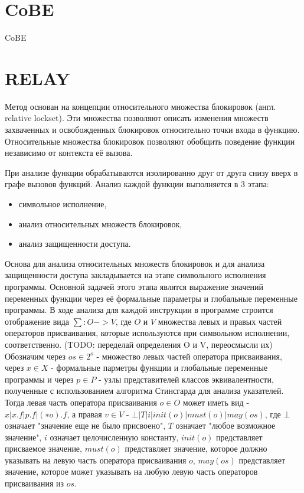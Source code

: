 \section{CoBE}
CoBE

\section{RELAY}

Метод основан на концепции относительного множества блокировок (англ. relative lockset). Эти множества позволяют описать изменения множеств захваченных и освобожденных блокировок относительно точки входа в функцию. Относительные множества блокировок позволяют обобщить поведение функции независимо от контекста её вызова.

При анализе функции обрабатываются изолированно друг от друга снизу вверх в графе вызовов функций. Анализ каждой функции выполняется в 3 этапа:
\begin{itemize}
\item символьное исполнение,
\item анализ относительных множеств блокировок,
\item анализ защищенности доступа.
\end{itemize}

Основа для анализа относительных множеств блокировок и для анализа защищенности доступа закладывается на этапе символьного исполнения программы. Основной задачей этого этапа являтся выражение значений переменных функции через её формальные параметры и глобальные переменные программы. В ходе анализа для каждой инструкции в программе строится отображение вида $\sum: O->V$, где $O$ и $V$ множества левых и правых частей операторов присваивания, которые используются при символьном исполнении, соответственно. (TODO: переделай определения O и V, переосмысли их) Обозначим через $os \in 2^{o}$ - множество левых частей оператора присваивания, через $x \in X$ - формальные парметры функции и глобальные переменные программы и через $p \in P$ - узлы представителей классов эквивалентности, полученные с использованием алгоритма Стинсгарда для анализа указателей. Тогда левая часть оператора присваивания $o \in O$ может иметь вид - $x | x.f | p.f | (∗o).f$, а правая $v \in V$ - $⊥ | T | i | init(o) | must(o) | may(os)$, где $⊥$ означает "значение еще не было присвоено", $T$ означает "любое возможное значение", $i$ означает целочисленную константу, $init(o)$ представляет присваемое значение, $must(o)$ представляет значение, которое должно указывать на левую часть оператора присваивания $o$, $may(os)$ представляет значение, которое может указывать на любую левую часть операторов присваивания из $os$.

